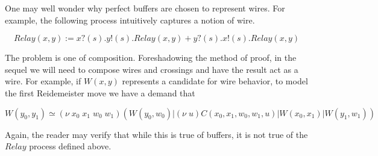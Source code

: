 One may well wonder why perfect buffers are chosen to represent
wires. For example, the following process intuitively captures a notion of wire.

\begin{equation*}
  Relay(x,y) := x?(s).y!(s).Relay(x,y) + y?(s).x!(s).Relay(x,y)
\end{equation*}

The problem is one of composition. Foreshadowing the method of proof,
in the sequel we will need to compose wires and crossings and have the
result act as a wire. For example, if $W(x,y)$ represents a candidate
for wire behavior, to model the first Reidemeister move we have a demand that

\begin{equation*}
  W(y_{0},y_{1}) \simeq (\nu \; x_{0} \; x_{1} \; w_{0} \; w_{1} )(W(y_{0},w_{0}) |(\nu \; u)C(x_{0},x_{1},w_{0},w_{1},u) | W(x_{0},x_{1}) | W(y_{1},w_{1}))
\end{equation*}

Again, the reader may verify that while this is true of buffers, it is
not true of the $Relay$ process defined above.
